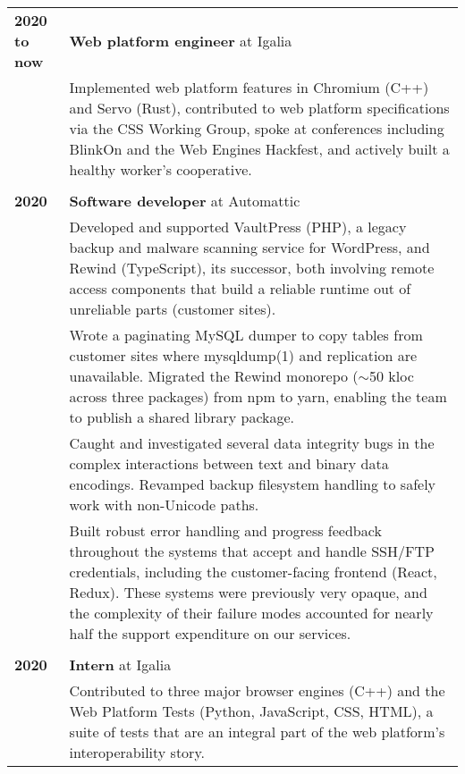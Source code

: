 \documentclass[a4paper,12pt]{article}
\begin{document}
\begin{tabular}{p{35mm}p{125mm}}
	                    \textbf{2020 to now}        & \textbf{Web platform engineer} at Igalia
	\vspace{0.2em}  \\                              & Implemented web platform features in Chromium (C++) and Servo (Rust), contributed to web platform specifications via the CSS Working Group, spoke at conferences including BlinkOn and the Web Engines Hackfest, and actively built a healthy worker’s cooperative.
	\\              \\  \textbf{2020}               & \textbf{Software developer} at Automattic
	\vspace{0.2em}  \\                              & Developed and supported VaultPress (PHP), a legacy backup and malware scanning service for WordPress, and Rewind (TypeScript), its successor, both involving remote access components that build a reliable runtime out of unreliable parts (customer sites).
	\vspace{0.2em}  \\                              & Wrote a paginating MySQL dumper to copy tables from customer sites where mysqldump(1) and replication are unavailable. Migrated the Rewind monorepo ($\sim$50 kloc across three packages) from npm to yarn, enabling the team to publish a shared library package.
	\vspace{0.2em}  \\                              & Caught and investigated several data integrity bugs in the complex interactions between text and binary data encodings. Revamped backup filesystem handling to safely work with non-Unicode paths.
	\vspace{0.2em}  \\                              & Built robust error handling and progress feedback throughout the systems that accept and handle SSH/FTP credentials, including the customer-facing frontend (React, Redux). These systems were previously very opaque, and the complexity of their failure modes accounted for nearly half the support expenditure on our services.
	\\              \\  \textbf{2020}               & \textbf{Intern} at Igalia
	\vspace{0.2em}  \\                              & Contributed to three major browser engines (C++) and the Web Platform Tests (Python, JavaScript, CSS, HTML), a suite of tests that are an integral part of the web platform’s interoperability story.

\end{tabular}
\end{document}
